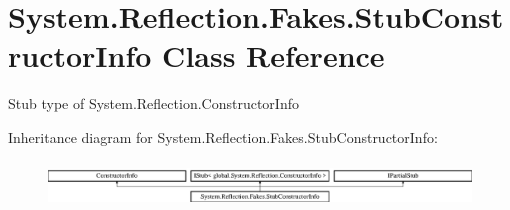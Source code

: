 \hypertarget{class_system_1_1_reflection_1_1_fakes_1_1_stub_constructor_info}{\section{System.\-Reflection.\-Fakes.\-Stub\-Constructor\-Info Class Reference}
\label{class_system_1_1_reflection_1_1_fakes_1_1_stub_constructor_info}
}


Stub type of System.\-Reflection.\-Constructor\-Info 


Inheritance diagram for System.\-Reflection.\-Fakes.\-Stub\-Constructor\-Info\-:\begin{figure}[H]
\begin{center}
\leavevmode
\includegraphics[height=1.240310cm]{class_system_1_1_reflection_1_1_fakes_1_1_stub_constructor_info}
\end{center}
\end{figure}
